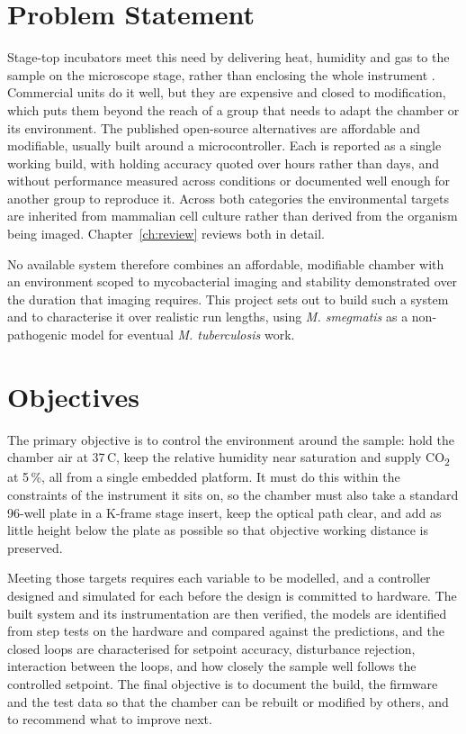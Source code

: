 \section{Problem Statement}
\label{sec:problem-statement}

Stage-top incubators meet this need by delivering heat, humidity and gas to the sample on the microscope stage, rather than enclosing the whole instrument \citep{talebipour_facilitating_2024}. Commercial units do it well, but they are expensive and closed to modification, which puts them beyond the reach of a group that needs to adapt the chamber or its environment. The published open-source alternatives are affordable and modifiable, usually built around a microcontroller. Each is reported as a single working build, with holding accuracy quoted over hours rather than days, and without performance measured across conditions or documented well enough for another group to reproduce it. Across both categories the environmental targets are inherited from mammalian cell culture rather than derived from the organism being imaged. Chapter~\ref{ch:review} reviews both in detail.

No available system therefore combines an affordable, modifiable chamber with an environment scoped to mycobacterial imaging and stability demonstrated over the duration that imaging requires. This project sets out to build such a system and to characterise it over realistic run lengths, using \textit{M. smegmatis} as a non-pathogenic model for eventual \textit{M. tuberculosis} work.

\section{Objectives}
\label{sec:objectives}

The primary objective is to control the environment around the sample: hold the chamber air at 37\,\textdegree{}C, keep the relative humidity near saturation and supply CO\textsubscript{2} at 5\,\%, all from a single embedded platform. It must do this within the constraints of the instrument it sits on, so the chamber must also take a standard 96-well plate in a K-frame stage insert, keep the optical path clear, and add as little height below the plate as possible so that objective working distance is preserved.

Meeting those targets requires each variable to be modelled, and a controller designed and simulated for each before the design is committed to hardware. The built system and its instrumentation are then verified, the models are identified from step tests on the hardware and compared against the predictions, and the closed loops are characterised for setpoint accuracy, disturbance rejection, interaction between the loops, and how closely the sample well follows the controlled setpoint. The final objective is to document the build, the firmware and the test data so that the chamber can be rebuilt or modified by others, and to recommend what to improve next.

